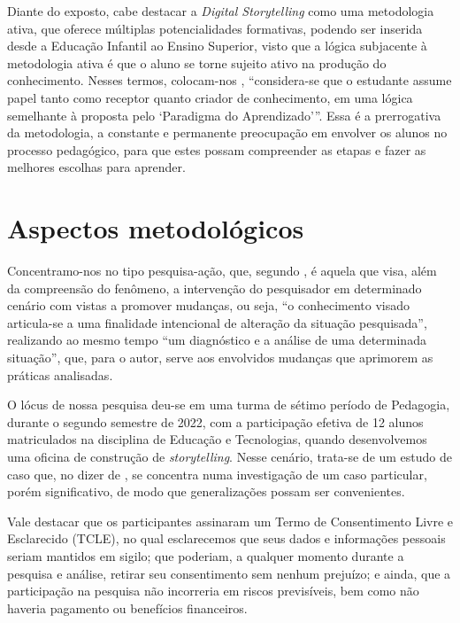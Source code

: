 \documentclass[portuguese]{textolivre}
\begin{document}
Diante do exposto, cabe destacar a \textit{Digital Storytelling} como uma metodologia ativa, que oferece múltiplas potencialidades formativas, podendo ser inserida desde a Educação Infantil ao Ensino Superior, visto que a lógica subjacente à metodologia ativa é que o aluno se torne sujeito ativo na produção do conhecimento. Nesses termos, colocam-nos \textcite[p.~223]{valenca2019storytelling}, “considera-se que o estudante assume papel tanto como receptor quanto criador de conhecimento, em uma lógica semelhante à proposta pelo ‘Paradigma do Aprendizado’”. Essa é a prerrogativa da metodologia, a constante e permanente preocupação em envolver os alunos no processo pedagógico, para que estes possam compreender as etapas e fazer as melhores escolhas para aprender.

\section{Aspectos metodológicos}\label{sec-conduta}
Concentramo-nos no tipo pesquisa-ação, que, segundo \textcite[p.~127]{severino2016metodologia}, é aquela que visa, além da compreensão do fenômeno, a intervenção do pesquisador em determinado cenário com vistas a promover mudanças, ou seja, “o conhecimento visado articula-se a uma finalidade intencional de alteração da situação pesquisada”, realizando ao mesmo tempo “um diagnóstico e a análise de uma determinada situação”, que, para o autor, serve aos envolvidos mudanças que aprimorem as práticas analisadas.

O lócus de nossa pesquisa deu-se em uma turma de sétimo período de Pedagogia, durante o segundo semestre de 2022, com a participação efetiva de 12 alunos matriculados na disciplina de Educação e Tecnologias, quando desenvolvemos uma oficina de construção de \textit{storytelling}. Nesse cenário, trata-se de um estudo de caso que, no dizer de \textcite{severino2016metodologia}, se concentra numa investigação de um caso particular, porém significativo, de modo que generalizações possam ser convenientes.   

Vale destacar que os participantes assinaram um Termo de Consentimento Livre e Esclarecido (TCLE), no qual esclarecemos que seus dados e informações pessoais seriam mantidos em sigilo; que poderiam, a qualquer momento durante a pesquisa e análise, retirar seu consentimento sem nenhum prejuízo; e ainda, que a participação na pesquisa não incorreria em riscos previsíveis, bem como não haveria pagamento ou benefícios financeiros.
\end{document}
